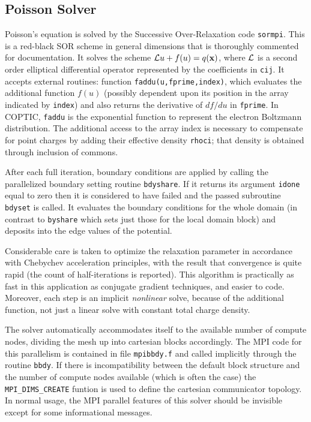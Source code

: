\documentclass[12pt]{article}
\begin{document}
\subsection{Poisson Solver}

Poisson's equation is solved by the Successive Over-Relaxation code
\verb!sormpi!. This is a red-black SOR scheme in general dimensions
that is thoroughly commented for documentation. It solves the scheme
${\cal L}u+f(u) = q({\bf x})$, where ${\cal L}$ is a second order
elliptical differential operator represented by the coefficients in
\verb!cij!. It accepts external routines: function
\verb!faddu(u,fprime,index)!, which evaluates the additional function
$f(u)$ (possibly dependent upon its position in the array indicated by
\verb!index!) and also returns the derivative of $df/du$ in
\verb!fprime!. In COPTIC, \verb!faddu! is the exponential function to
represent the electron Boltzmann distribution. The additional access
to the array index is necessary to compensate for point charges by
adding their effective density \verb!rhoci!; that density is obtained
through inclusion of commons. 

After each full iteration, boundary conditions are applied by calling
the parallelized boundary setting routine \verb!bdyshare!. If it
returns its argument \verb!idone!  equal to zero then it is
considered to have failed and the passed subroutine \verb!bdyset! is
called. It evaluates the boundary conditions for the whole domain (in
contrast to \verb!byshare! which sets just those for the local domain
block) and deposits into the edge values of the potential.

Considerable care is taken to optimize the relaxation parameter in
accordance with Chebychev acceleration principles, with the result
that convergence is quite rapid (the count of half-iterations is
reported). This algorithm is practically as fast in this application as
conjugate gradient techniques, and easier to code. Moreover, each step is an
implicit \emph{nonlinear} solve, because of the additional function,
not just a linear solve with constant total charge density.

The solver automatically accommodates itself to the available number
of compute nodes, dividing the mesh up into cartesian blocks
accordingly.  The MPI code for this parallelism is contained in file
\verb!mpibbdy.f! and called implicitly through the routine
\verb!bbdy!. If there is incompatibility between the default block
structure and the number of compute nodes available (which is often
the case) the \verb!MPI_DIMS_CREATE! funtion is used to define the
cartesian communicator topology. In normal usage, the MPI parallel
features of this solver should be invisible except for some
informational messages.  
\end{document}
